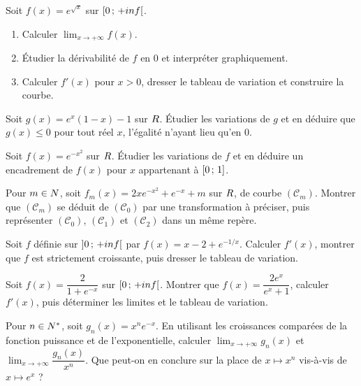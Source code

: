 \begin{annales}
Soit $f(x) = e^{\sqrt x}$ sur $\left[0\,;\,+inf\right[$.
\begin{enumerate}[label=\textbf{\alph*)}, leftmargin=*, itemsep=0.15em]
  \item Calculer $\lim_{x\to+\infty}f(x)$.
  \item Étudier la dérivabilité de $f$ en $0$ et interpréter graphiquement.
  \item Calculer $f'(x)$ pour $x>0$, dresser le tableau de variation et
        construire la courbe.
\end{enumerate}

Soit $g(x) = e^{x}(1-x)-1$ sur $R$. Étudier les variations de $g$ et en
déduire que $g(x) \leq 0$ pour tout réel $x$, l'égalité n'ayant lieu qu'en
$0$.

Soit $f(x) = e^{-x^{2}}$ sur $R$. Étudier les variations de $f$ et en déduire
un encadrement de $f(x)$ pour $x$ appartenant à $\left[0\,;\,1\right]$.

Pour $m\in N$, soit $f_{m}(x) = 2xe^{-x^{2}}+e^{-x}+m$ sur $R$, de courbe
$(\mathcal C_{m})$. Montrer que $(\mathcal C_{m})$ se déduit de
$(\mathcal C_{0})$ par une transformation à préciser, puis représenter
$(\mathcal C_{0})$, $(\mathcal C_{1})$ et $(\mathcal C_{2})$ dans un même
repère.

Soit $f$ définie sur $\left]0\,;\,+inf\right[$ par $f(x) = x-2+e^{-1/x}$.
Calculer $f'(x)$, montrer que $f$ est strictement croissante, puis dresser le
tableau de variation.

Soit $f(x) = \dfrac{2}{1+e^{-x}}$ sur $\left[0\,;\,+inf\right[$. Montrer
que $f(x) = \dfrac{2e^{x}}{e^{x}+1}$, calculer $f'(x)$, puis déterminer les
limites et le tableau de variation.

Pour $n\in N^{*}$, soit $g_{n}(x) = x^{n}e^{-x}$. En utilisant les
croissances comparées de la fonction puissance et de l'exponentielle,
calculer $\lim_{x\to+\infty}g_{n}(x)$ et
$\lim_{x\to+\infty}\dfrac{g_{n}(x)}{x^{n}}$. Que peut-on en conclure sur la
place de $x \mapsto x^{n}$ vis-à-vis de $x \mapsto e^{x}$ ?


\end{annales}
